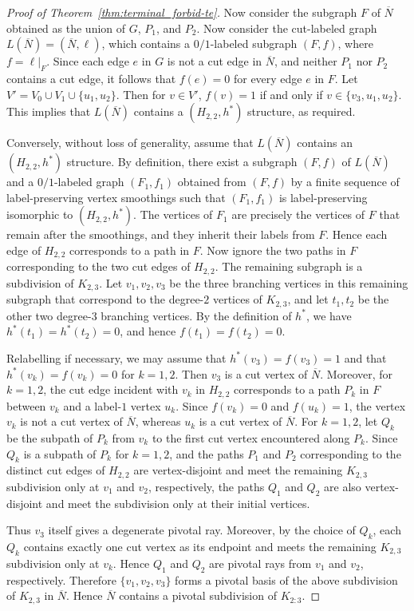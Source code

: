 \documentclass[pdflatex,sn-mathphys-num]{sn-jnl}
\theoremstyle{thmstyleone}%
\theoremstyle{thmstyletwo}%
\theoremstyle{thmstylethree}%
\begin{document}
\begin{appendices}
\begin{proof}[Proof of Theorem~\ref{thm:terminal_forbid-te}]
Now consider the subgraph $F$ of $\overline{N}$ obtained as the union of $G$, $P_1$, and $P_2$.
Now consider the cut-labeled graph $L(\overline{N})=(\overline{N},\ell)$, which contains a $0/1$-labeled subgraph $(F,f)$, where $f=\ell|_F$.
Since each edge $e$ in $G$ is not a cut edge in $\overline{N}$, and neither $P_1$ nor $P_2$ contains a cut edge, it follows that $f(e)=0$ for every edge $e$ in $F$.
Let $V'=V_0\cup V_1 \cup \{u_1,u_2\}$. Then for $v\in V'$, $f(v)=1$ if and only if $v\in \{v_3,u_1,u_2\}$. 
This implies that $L(\overline{N})$ contains a $(H_{2,2},h^*)$ structure, as required.


Conversely, without loss of generality, assume that $L(\overline{N})$ contains an $(H_{2,2},h^*)$ structure. By definition, there exist a subgraph $(F,f)$ of $L(\overline{N})$ and a $0/1$-labeled graph $(F_1,f_1)$ obtained from $(F,f)$ by a finite sequence of label-preserving vertex smoothings such that $(F_1,f_1)$ is label-preserving isomorphic to $(H_{2,2},h^*)$. 
The vertices of $F_1$ are precisely the vertices of $F$ that remain after the smoothings, and they inherit their labels from $F$. Hence each edge of $H_{2,2}$ corresponds to a path in $F$. Now ignore the two paths in $F$ corresponding to the two cut edges of $H_{2,2}$. The remaining subgraph is a subdivision of $K_{2,3}$. Let $v_1,v_2,v_3$ be the three branching vertices in this remaining subgraph that correspond to the degree-$2$ vertices of $K_{2,3}$, and let $t_1,t_2$ be the other two degree-$3$ branching vertices. By the definition of $h^*$, we have $h^*(t_1)=h^*(t_2)=0$, and hence $f(t_1)=f(t_2)=0$.

Relabelling if necessary, we may assume that $h^*(v_3)=f(v_3)=1$ and that $h^*(v_k)=f(v_k)=0$ for $k=1,2$. Then $v_3$ is a cut vertex of $\overline{N}$. Moreover, for $k=1,2$, the cut edge incident with $v_k$ in $H_{2,2}$ corresponds to a path $P_k$ in $F$ between $v_k$ and a label-$1$ vertex $u_k$.
Since $f(v_k)=0$ and $f(u_k)=1$, the vertex $v_k$ is not a cut vertex of $\overline{N}$, whereas $u_k$ is a cut vertex of $\overline{N}$.
For $k=1,2$, let $Q_k$ be the subpath of $P_k$ from $v_k$ to the first cut vertex encountered along $P_k$. Since $Q_k$ is a subpath of $P_k$ for $k=1,2$, and the paths $P_1$ and $P_2$ corresponding to the distinct cut edges of $H_{2,2}$ are vertex-disjoint and meet the remaining $K_{2,3}$ subdivision only at $v_1$ and $v_2$, respectively, the paths $Q_1$ and $Q_2$ are also vertex-disjoint and meet the subdivision only at their initial vertices.


Thus $v_3$ itself gives a degenerate pivotal ray. 
Moreover, by the choice of $Q_k$, each $Q_k$ contains exactly one cut vertex as its endpoint and meets the remaining $K_{2,3}$ subdivision only at $v_k$.
Hence $Q_1$ and $Q_2$ are pivotal rays from $v_1$ and $v_2$, respectively. Therefore $\{v_1,v_2,v_3\}$ forms a pivotal basis of the above subdivision of $K_{2,3}$ in $\overline{N}$. Hence $\overline{N}$ contains a pivotal subdivision of $K_{2:3}$.



\end{proof}
\end{appendices}
\end{document}
